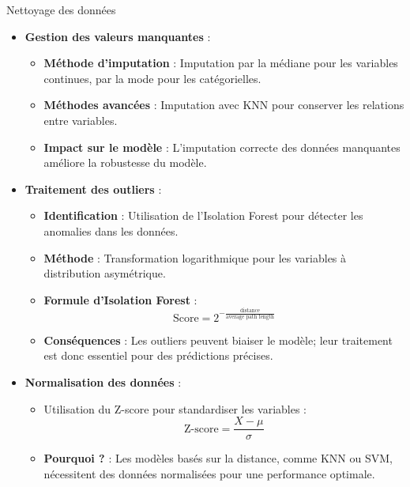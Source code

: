 \documentclass{beamer}
\begin{document}
\begin{frame}{Nettoyage des données}
    \begin{itemize}
        \item \textbf{Gestion des valeurs manquantes} :
            \begin{itemize}
                \item \textbf{Méthode d'imputation} : Imputation par la médiane pour les variables continues, par la mode pour les catégorielles.
                \item \textbf{Méthodes avancées} : Imputation avec KNN pour conserver les relations entre variables.
                \item \textbf{Impact sur le modèle} : L'imputation correcte des données manquantes améliore la robustesse du modèle.
            \end{itemize}
        \item \textbf{Traitement des outliers} :
            \begin{itemize}
                \item \textbf{Identification} : Utilisation de l'Isolation Forest pour détecter les anomalies dans les données.
                \item \textbf{Méthode} : Transformation logarithmique pour les variables à distribution asymétrique.
                \item \textbf{Formule d'Isolation Forest} :
                \[
                \text{Score} = 2^{-\frac{\text{distance}}{\text{average path length}}}
                \]
                \item \textbf{Conséquences} : Les outliers peuvent biaiser le modèle; leur traitement est donc essentiel pour des prédictions précises.
            \end{itemize}
        \item \textbf{Normalisation des données} :
            \begin{itemize}
                \item Utilisation du Z-score pour standardiser les variables :
                \[
                \text{Z-score} = \frac{X - \mu}{\sigma}
                \]
                \item \textbf{Pourquoi ?} : Les modèles basés sur la distance, comme KNN ou SVM, nécessitent des données normalisées pour une performance optimale.
            \end{itemize}
    \end{itemize}

\end{frame}
\end{document}

